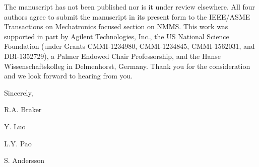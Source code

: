 \documentclass[a4paper,twoside]{article}
\begin{document}
The manuscript has not been published nor is it under review elsewhere. All four authors agree to submit the manuscript in its present form to the IEEE/ASME Transactions on Mechatronics focused section on NMMS. This work was supported in part by Agilent Technologies, Inc., the US National Science Foundation (under Grants CMMI-1234980, CMMI-1234845, CMMI-1562031, and DBI-1352729),
a Palmer Endowed Chair Professorship,
and the Hanse Wissenschaftskolleg in Delmenhorst, Germany. Thank you for the consideration and we look forward to hearing from you.

\par\bigskip
\noindent Sincerely,
\par\bigskip
\noindent R.A. Braker\par
\noindent Y. Luo\par
\noindent L.Y. Pao\par
\noindent S. Andersson
\end{document}

